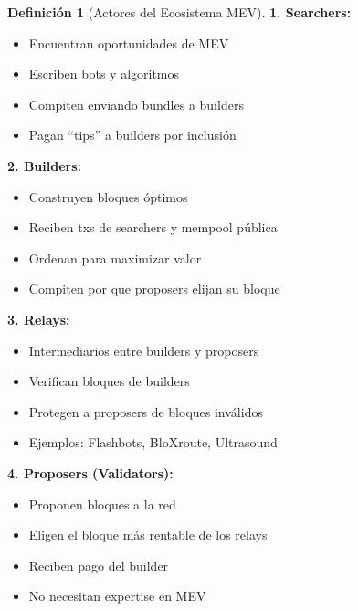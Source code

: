 \documentclass[11pt,a4paper,twoside,openright]{book}
\theoremstyle{definition}
\newtheorem{definition}{Definición}[chapter]
\theoremstyle{plain}
\theoremstyle{remark}
\begin{document}
\begin{definition}[Actores del Ecosistema MEV]
\textbf{1. Searchers:}
\begin{itemize}
    \item Encuentran oportunidades de MEV
    \item Escriben bots y algoritmos
    \item Compiten enviando bundles a builders
    \item Pagan ``tips'' a builders por inclusión
\end{itemize}

\textbf{2. Builders:}
\begin{itemize}
    \item Construyen bloques óptimos
    \item Reciben txs de searchers y mempool pública
    \item Ordenan para maximizar valor
    \item Compiten por que proposers elijan su bloque
\end{itemize}

\textbf{3. Relays:}
\begin{itemize}
    \item Intermediarios entre builders y proposers
    \item Verifican bloques de builders
    \item Protegen a proposers de bloques inválidos
    \item Ejemplos: Flashbots, BloXroute, Ultrasound
\end{itemize}

\textbf{4. Proposers (Validators):}
\begin{itemize}
    \item Proponen bloques a la red
    \item Eligen el bloque más rentable de los relays
    \item Reciben pago del builder
    \item No necesitan expertise en MEV
\end{itemize}
\end{definition}
\end{document}
